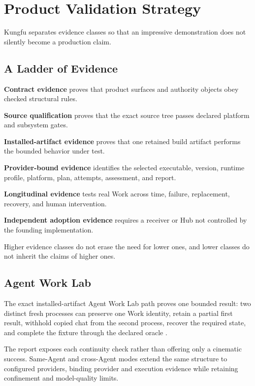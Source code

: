 \section{Product Validation Strategy}

Kungfu separates evidence classes so that an impressive demonstration does
not silently become a production claim.

\subsection{A Ladder of Evidence}

\begin{evidenceladder}
  \item \textbf{Contract evidence} proves that product surfaces and authority
  objects obey checked structural rules.
  \item \textbf{Source qualification} proves that the exact source tree passes
  declared platform and subsystem gates.
  \item \textbf{Installed-artifact evidence} proves that one retained build
  artifact performs the bounded behavior under test.
  \item \textbf{Provider-bound evidence} identifies the selected executable,
  version, runtime profile, platform, plan, attempts, assessment, and report.
  \item \textbf{Longitudinal evidence} tests real Work across time, failure,
  replacement, recovery, and human intervention.
  \item \textbf{Independent adoption evidence} requires a receiver or Hub not
  controlled by the founding implementation.
\end{evidenceladder}

Higher evidence classes do not erase the need for lower ones, and lower
classes do not inherit the claims of higher ones.

\subsection{Agent Work Lab}

The exact installed-artifact Agent Work Lab path proves one bounded result:
two distinct fresh processes can preserve one Work identity, retain a partial
first result, withhold copied chat from the second process, recover the
required state, and complete the fixture through the declared oracle
\cite{agentWorkLab}.

The report exposes each continuity check rather than offering only a cinematic
success. Same-Agent and cross-Agent modes extend the same structure to
configured providers, binding provider and execution evidence while retaining
confinement and model-quality limits.

